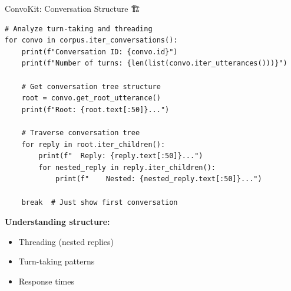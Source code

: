 \documentclass[aspectratio=169]{beamer}
\begin{document}
\begin{frame}[fragile]{ConvoKit: Conversation Structure 🏗️}
    \begin{lstlisting}
# Analyze turn-taking and threading
for convo in corpus.iter_conversations():
    print(f"Conversation ID: {convo.id}")
    print(f"Number of turns: {len(list(convo.iter_utterances()))}")

    # Get conversation tree structure
    root = convo.get_root_utterance()
    print(f"Root: {root.text[:50]}...")

    # Traverse conversation tree
    for reply in root.iter_children():
        print(f"  Reply: {reply.text[:50]}...")
        for nested_reply in reply.iter_children():
            print(f"    Nested: {nested_reply.text[:50]}...")

    break  # Just show first conversation
    \end{lstlisting}

    \vspace{0.3cm}

    \textbf{Understanding structure:}
    \begin{itemize}\setlength{\itemsep}{0pt}
        \item Threading (nested replies)
        \item Turn-taking patterns
        \item Response times
    \end{itemize}
\end{frame}
\end{document}
